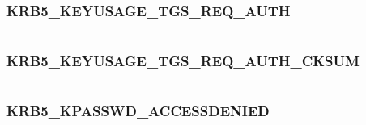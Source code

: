\documentclass[letterpaper,10pt,english]{sphinxmanual}
\begin{document}
\subsubsection{KRB5\_KEYUSAGE\_TGS\_REQ\_AUTH}
\label{appdev/refs/macros/KRB5_KEYUSAGE_TGS_REQ_AUTH::doc}\label{appdev/refs/macros/KRB5_KEYUSAGE_TGS_REQ_AUTH:krb5-keyusage-tgs-req-auth}\label{appdev/refs/macros/KRB5_KEYUSAGE_TGS_REQ_AUTH:krb5-keyusage-tgs-req-auth-data}

\begin{fulllineitems}
\label{appdev/refs/macros/KRB5_KEYUSAGE_TGS_REQ_AUTH:KRB5_KEYUSAGE_TGS_REQ_AUTH}
\end{fulllineitems}


\begin{tabulary}{\linewidth}{|L|L|}
\hline

 & 
\\
\hline\end{tabulary}



\subsubsection{KRB5\_KEYUSAGE\_TGS\_REQ\_AUTH\_CKSUM}
\label{appdev/refs/macros/KRB5_KEYUSAGE_TGS_REQ_AUTH_CKSUM:krb5-keyusage-tgs-req-auth-cksum-data}\label{appdev/refs/macros/KRB5_KEYUSAGE_TGS_REQ_AUTH_CKSUM::doc}\label{appdev/refs/macros/KRB5_KEYUSAGE_TGS_REQ_AUTH_CKSUM:krb5-keyusage-tgs-req-auth-cksum}

\begin{fulllineitems}
\label{appdev/refs/macros/KRB5_KEYUSAGE_TGS_REQ_AUTH_CKSUM:KRB5_KEYUSAGE_TGS_REQ_AUTH_CKSUM}
\end{fulllineitems}


\begin{tabulary}{\linewidth}{|L|L|}
\hline

 & 
\\
\hline\end{tabulary}



\subsubsection{KRB5\_KPASSWD\_ACCESSDENIED}
\label{appdev/refs/macros/KRB5_KPASSWD_ACCESSDENIED:krb5-kpasswd-accessdenied}\label{appdev/refs/macros/KRB5_KPASSWD_ACCESSDENIED:krb5-kpasswd-accessdenied-data}\label{appdev/refs/macros/KRB5_KPASSWD_ACCESSDENIED::doc}
\end{document}
